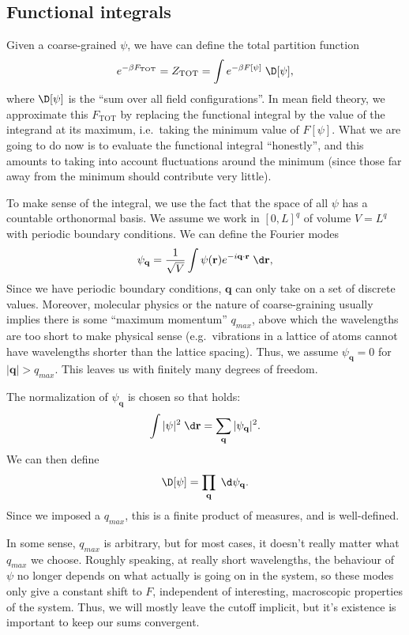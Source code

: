 \documentclass[a4paper]{article}
\begin{document}
\subsection{Functional integrals}
Given a coarse-grained $\psi$, we have can define the total partition function
\[
  e^{-\beta F_{\mathrm{TOT}}} = Z_{\mathrm{TOT}} = \int e^{-\beta F[\psi]} \;\D [\psi],
\]
where $\D [\psi]$ is the ``sum over all field configurations''. In mean field theory, we approximate this $F_{\mathrm{TOT}}$ by replacing the functional integral by the value of the integrand at its maximum, i.e.\ taking the minimum value of $F[\psi]$. What we are going to do now is to evaluate the functional integral ``honestly'', and this amounts to taking into account fluctuations around the minimum (since those far away from the minimum should contribute very little).

To make sense of the integral, we use the fact that the space of all $\psi$ has a countable orthonormal basis. We assume we work in $[0, L]^q$ of volume $V = L^q$ with periodic boundary conditions. We can define the Fourier modes
\[
  \psi_\mathbf{q} = \frac{1}{\sqrt{V}} \int \psi(\mathbf{r}) e^{-i\mathbf{q}\cdot \mathbf{r}}\;\d \mathbf{r},
\]
Since we have periodic boundary conditions, $\mathbf{q}$ can only take on a set of discrete values. Moreover, molecular physics or the nature of coarse-graining usually implies there is some ``maximum momentum'' $q_{max}$, above which the wavelengths are too short to make physical sense (e.g.\ vibrations in a lattice of atoms cannot have wavelengths shorter than the lattice spacing). Thus, we assume $\psi_\mathbf{q} = 0$ for $|\mathbf{q}| > q_{max}$. This leaves us with finitely many degrees of freedom.

The normalization of $\psi_\mathbf{q}$ is chosen so that  holds:
\[
  \int |\psi|^2 \;\d \mathbf{r} = \sum_{\mathbf{q} } |\psi_\mathbf{q}|^2.
\]
We can then define
\[
  \D [\psi] = \prod_{\mathbf{q}} \;\d \psi_\mathbf{q}.
\]
Since we imposed a $q_{max}$, this is a finite product of measures, and is well-defined.

In some sense, $q_{max}$ is arbitrary, but for most cases, it doesn't really matter what $q_{max}$ we choose. Roughly speaking, at really short wavelengths, the behaviour of $\psi$ no longer depends on what actually is going on in the system, so these modes only give a constant shift to $F$, independent of interesting, macroscopic properties of the system. Thus, we will mostly leave the cutoff implicit, but it's existence is important to keep our sums convergent.
\end{document}
